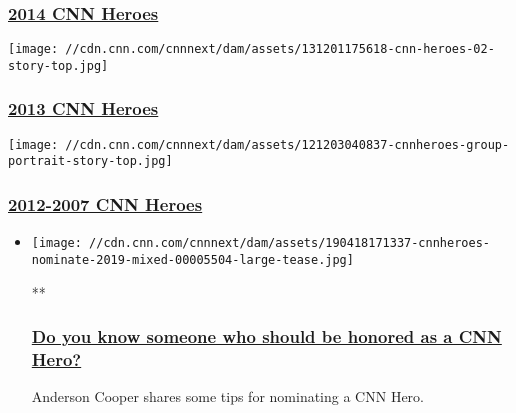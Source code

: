 \hypertarget{2014-cnn-heroes}{%
\subsubsection{\texorpdfstring{\href{http://www.cnn.com/specials/cnn-heroes-2014-archive}{2014
CNN Heroes}}{2014 CNN Heroes}}\label{2014-cnn-heroes}}

\href{http://www.cnn.com/SPECIALS/cnn.heroes/2013.heroes/index.html}{}

\texttt{[image: //cdn.cnn.com/cnnnext/dam/assets/131201175618-cnn-heroes-02-story-top.jpg]}

\hypertarget{2013-cnn-heroes}{%
\subsubsection{\texorpdfstring{\href{http://www.cnn.com/SPECIALS/cnn.heroes/2013.heroes/index.html}{2013
CNN Heroes}}{2013 CNN Heroes}}\label{2013-cnn-heroes}}

\href{http://www.cnn.com/SPECIALS/cnn.heroes/archive12/index.html}{}

\texttt{[image: //cdn.cnn.com/cnnnext/dam/assets/121203040837-cnnheroes-group-portrait-story-top.jpg]}

\hypertarget{2012-2007-cnn-heroes}{%
\subsubsection{\texorpdfstring{\href{http://www.cnn.com/SPECIALS/cnn.heroes/archive12/index.html}{2012-2007
CNN Heroes}}{2012-2007 CNN Heroes}}\label{2012-2007-cnn-heroes}}

\begin{itemize}
\item
  \href{/videos/us/2019/04/18/cnnheroes-nominate-2019-mixed.cnn}{}

  \texttt{[image: //cdn.cnn.com/cnnnext/dam/assets/190418171337-cnnheroes-nominate-2019-mixed-00005504-large-tease.jpg]}

  **

  \hypertarget{do-you-know-someone-who-should-be-honored-as-a-cnn-hero}{%
  \subsubsection{\texorpdfstring{\href{/videos/us/2019/04/18/cnnheroes-nominate-2019-mixed.cnn}{Do
  you know someone who should be honored as a CNN
  Hero?}}{Do you know someone who should be honored as a CNN Hero?}}\label{do-you-know-someone-who-should-be-honored-as-a-cnn-hero}}

  Anderson Cooper shares some tips for nominating a CNN Hero.
\end{itemize}

